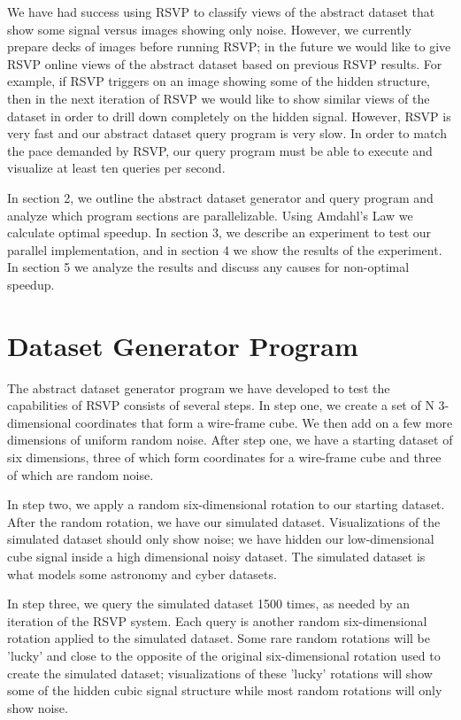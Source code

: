 \documentclass[12pt, letterpaper]{article}
\begin{document}
We have had success using RSVP to classify views of the abstract dataset that show some signal versus 
images showing only noise.  However, we 
currently prepare decks of images before running RSVP; in the future we would like to give RSVP online views of 
the abstract 
dataset based on previous RSVP results.  For example, if RSVP triggers on an image showing some of the hidden 
structure, then in the next iteration of RSVP we would like to show similar views of the dataset in order to drill down
completely on the hidden signal.  However, RSVP is very fast and our abstract dataset query program is very slow.  
In order to match the pace demanded by RSVP, our query program must be able to execute and visualize at least ten
queries per second.  

In section 2, we outline the abstract dataset generator and query program and analyze which program sections are 
parallelizable.  Using Amdahl's Law\cite{Amdahl} we calculate optimal speedup.  In section 3, we describe an 
experiment to test our parallel implementation, and in section 4 we show the results of the experiment.  
In section 5 we analyze the results and discuss any causes for non-optimal speedup.

\section{Dataset Generator Program}

The abstract dataset generator program we have developed to test the capabilities of RSVP consists of several steps.
In step one, we create a set of N 3-dimensional coordinates that form a wire-frame cube.  We then add on a few more 
dimensions of uniform random noise.  After step one, we have a starting dataset of six dimensions, three of which form 
coordinates for a wire-frame cube and three of which are random noise. 

In step two, we apply a random six-dimensional rotation to our starting dataset.  After the random rotation, we have 
our simulated dataset.  Visualizations of the simulated dataset should only show noise; we have hidden our 
low-dimensional cube signal inside a high dimensional noisy dataset.  The simulated dataset is what models 
some astronomy and cyber datasets. 

In step three, we query the simulated dataset 1500 times, as needed by an iteration of the RSVP system.  
Each query is another random six-dimensional rotation applied
to the simulated dataset.  Some rare random rotations will be 'lucky' and close to the opposite of the original 
six-dimensional rotation used to create the simulated dataset; visualizations of these 'lucky' rotations
will show some of the hidden cubic signal structure while most random rotations will only show noise.
\end{document}
